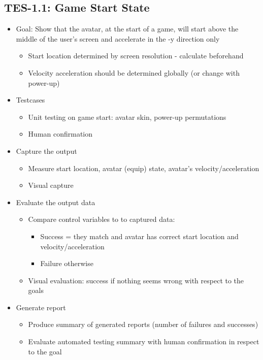 \subsection{TES-1.1: Game Start State}
\label{subsec:gamestartstate}
\begin{itemize}
\item Goal: Show that the avatar, at the start of a game, will start above the middle of the user\textquoteright{}s screen and accelerate in the -y direction only
\begin{itemize}
\item Start location determined by screen resolution - calculate beforehand
\item Velocity acceleration should be determined globally (or change with power-up)
\end{itemize}

\item Testcases
\begin{itemize}
\item Unit testing on game start: avatar skin, power-up permutations
\item Human confirmation
\end{itemize}

\item Capture the output
\begin{itemize}
\item Measure start location, avatar (equip) state, avatar’s velocity/acceleration
\item Visual capture
\end{itemize}

\item Evaluate the output data
\begin{itemize}
\item Compare control variables to to captured data:
\begin{itemize}
\item Success = they match and avatar has correct start location and velocity/acceleration
\item Failure otherwise
\end{itemize}

\item Visual evaluation: success if nothing seems wrong with respect to the goals
\end{itemize}

\item Generate report
\begin{itemize}
\item Produce summary of generated reports (number of failures and successes)
\item Evaluate automated testing summary with human confirmation in respect to the goal
\end{itemize}
\end{itemize}


